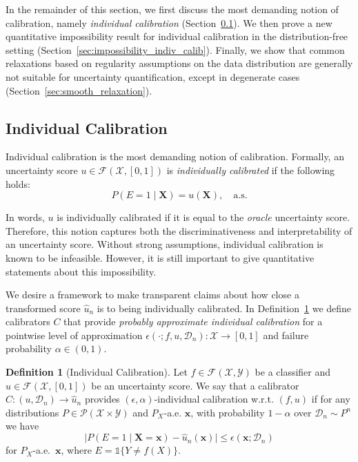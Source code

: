 \documentclass{article}
\theoremstyle{plain}
\theoremstyle{definition}
\newtheorem{definition}[theorem]{Definition}
\theoremstyle{remark}
\begin{document}
In the remainder of this section, we first discuss the most demanding notion of calibration, namely \emph{individual calibration} (Section~\ref{sec:indiv_calib}).
We then prove a new quantitative impossibility result for individual calibration in the distribution-free setting (Section~\ref{sec:impossibility_indiv_calib}).
Finally, we show that common relaxations based on regularity assumptions on the data distribution are generally not suitable for uncertainty quantification, except in degenerate cases (Section~\ref{sec:smooth_relaxation}).

\subsection{Individual Calibration}
\label{sec:indiv_calib}
Individual calibration \cite{zhao_individual_2020, rina2020inference} is the most demanding notion of calibration. Formally, an uncertainty score $u \in \mathcal{F}(\mathcal{X}, [0,1])$ is \textit{individually calibrated} if the following holds:
$$
P(E=1 \mid \mathbf{X}) = u(\mathbf{X}), \quad \mathrm{a.s.}
$$

In words, $u$ is individually calibrated if it is equal to the \textit{oracle} uncertainty score. Therefore, this notion captures both the discriminativeness and interpretability of an uncertainty score. Without strong assumptions, individual calibration is known to be infeasible. However, it is still important to give quantitative statements about this impossibility.

We desire a framework to make transparent claims about how close a transformed score $\widehat{u}_n$ is to being individually calibrated.
In Definition~\ref{def:indiv_calib} we define calibrators $C$ that provide \textit{probably approximate individual calibration} for a pointwise level of approximation $\epsilon(\cdot; f,u ,\mathcal D_n): \mathcal{X}\to [0,1]$ and failure probability $\alpha \in (0,1)$.

\begin{definition}[Individual Calibration]
\label{def:indiv_calib}
Let $f\in\mathcal F(\mathcal X,\mathcal Y)$ be a classifier and $u \in \mathcal{F}(\mathcal{X}, [0,1])$ be an uncertainty score. We say that a calibrator $C: (u,\mathcal{D}_n)\to \widehat{u}_n$ provides $(\epsilon, \alpha)$-individual calibration w.r.t. $(f,u)$ if for any distributions
$P\in\mathcal P(\mathcal X\times\mathcal Y)$ and $P_X$-a.e. $\mathbf{x}$, with probability $1-\alpha$ over $\mathcal{D}_n \sim P^n$ we have
\begin{equation}
\label{eq:indiv_calib}
\big|P(E=1 \mid \mathbf{X}=\mathbf{x}) - \widehat{u}_n(\mathbf{x})\big| \leq \epsilon(\mathbf{x}; \mathcal{D}_n) 
\end{equation}
for $P_X$-a.e.\ $\mathbf{x}$, where $E= \mathds{1}\{ Y \neq f(X)\}$.
\end{definition}
\end{document}
